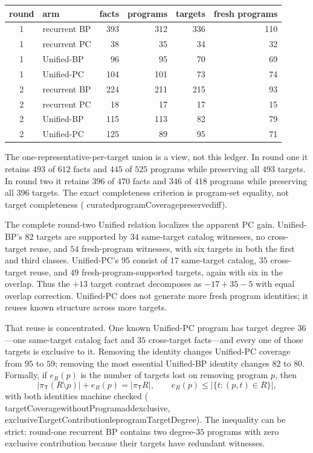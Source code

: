 \documentclass[11pt]{article}
\newcommand{\leanname}[1]{{\scriptsize\ttfamily
  \def\_{\textunderscore\allowbreak}#1}}
\begin{document}
\begin{center}\small
\begin{tabular}{@{}clrrrr@{}}
\toprule
round & arm & facts & programs & targets & fresh programs \\
\midrule
1 & recurrent BP & 393 & 312 & 336 & 110 \\
1 & recurrent PC &  38 &  35 &  34 &  32 \\
1 & Unified-BP   &  96 &  95 &  70 &  69 \\
1 & Unified-PC   & 104 & 101 &  73 &  74 \\
\midrule
2 & recurrent BP & 224 & 211 & 215 &  93 \\
2 & recurrent PC &  18 &  17 &  17 &  15 \\
2 & Unified-BP   & 115 & 113 &  82 &  79 \\
2 & Unified-PC   & 125 &  89 &  95 &  71 \\
\bottomrule
\end{tabular}
\end{center}

The one-representative-per-target union is a view, not this ledger. In round one it
retains $493$ of $612$ facts and $445$ of $525$ programs while preserving all $493$
targets. In round two it retains $396$ of $470$ facts and $346$ of $418$ programs while
preserving all $396$ targets. The exact completeness criterion is program-set equality,
not target completeness
(\leanname{curated\_programCoverage\_preserved\_iff}).

The complete round-two Unified relation localizes the apparent PC gain. Unified-BP's
$82$ targets are supported by $34$ same-target catalog witnesses, no cross-target reuse,
and $54$ fresh-program witnesses, with six targets in both the first and third classes.
Unified-PC's $95$ consist of $17$ same-target catalog, $35$ cross-target reuse, and $49$
fresh-program-supported targets, again with six in the overlap. Thus the $+13$ target
contrast decomposes as $-17+35-5$ with equal overlap correction. Unified-PC does not
generate more fresh program identities; it reuses known structure across more targets.

That reuse is concentrated. One known Unified-PC program has target degree $36$---one
same-target catalog fact and $35$ cross-target facts---and every one of those targets is
exclusive to it. Removing the identity changes Unified-PC coverage from $95$ to $59$;
removing the most essential Unified-BP identity changes $82$ to $80$. Formally, if
$e_R(p)$ is the number of targets lost on removing program $p$, then
\[
 |\pi_{\mathsf T}(R\setminus p)|+e_R(p)=|\pi_{\mathsf T}R|,
 \qquad e_R(p)\leq |\{t:(p,t)\in R\}|,
\]
with both identities machine checked
(\leanname{targetCoverage\_withoutProgram\_add\_exclusive},
\leanname{exclusiveTargetContribution\_le\_programTargetDegree}). The inequality can be
strict: round-one recurrent BP contains two degree-$35$ programs with zero exclusive
contribution because their targets have redundant witnesses.
\end{document}
